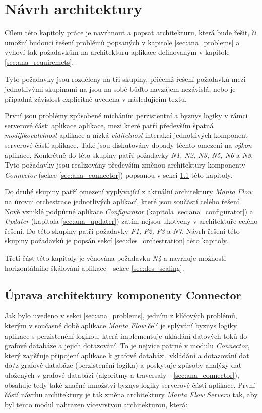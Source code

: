 \chapter{Návrh architektury}
Cílem této kapitoly práce je navrhnout a popsat architekturu, která bude řešit, či umožní budoucí řešení problémů popsaných v kapitole \ref{sec:ana_problems} a vyhoví tak požadavkům na architekturu aplikace definovaným v kapitole \ref{sec:ana_requiremets}.

Tyto požadavky jsou rozděleny na tři skupiny, přičemž řešení požadavků mezi jednotlivými skupinami na jsou na sobě bůďto navzájem nezávislá, nebo je případná závislost explicitně uvedena v následujícím textu.

První jsou problémy způsobené mícháním perzistentní a byznys logiky v rámci serverové části aplikace aplikace, mezi které patří především špatná \textit{modifikovatelnost} aplikace a nízká \textit{viditelnost} interakcí jednotlivých komponent serverové částí aplikace. Také jsou diskutovány dopady těchto omezení na \textit{výkon} aplikace. Konkrétně do této skupiny patří požadavky \textit{N1, N2, N3, N5, N6} a \textit{N8}. Tyto požadavky jsou realizovány především změnou architektury komponenty \textit{Connector} (sekce \ref{sec:ana_connector}) popsanou v sekci \ref{sec:des_api} této kapitoly.

Do druhé skupiny patří omezení vyplývající z aktuální architektury \textit{Manta Flow} na úrovni orchestrace jednotlivých aplikací, které jsou součástí celého řešení. Nově vzniklé podpůrné aplikace \textit{Configurator} (kapitola \ref{sec:ana_configurator}) a \textit{Updater} (kapitola \ref{sec:ana_updater}) zatím nejsou ukotveny v architektuře celého řešení.
Do této skupiny patří požadavky \textit{F1, F2, F3} a \textit{N7}. Návrh řešení této skupiny požadavků je popsán sekcí \ref{sec:des_orchestration} této kapitoly.

Třetí část této kapitoly je věnována požadavku \textit{N4} a navrhuje možnosti horizontálního škálování aplikace - sekce \ref{sec:des_scaling}.

\section{Úprava architektury komponenty Connector}
\label{sec:des_api}
Jak bylo uvedeno v sekci \ref{sec:ana_problems}, jedním z klíčových problémů, kterým v současné době aplikace \textit{Manta Flow} čelí je splývání byznys logiky aplikace s perzistenční logikou, která implementuje ukládání datových toků do grafové databáze a jejich dotazování. To je nejvíce patrné v modulu \textit{Connector}, který zajišťuje připojení aplikace k grafové databázi, vkládání a dotazování dat do/z grafové databáze (perzistenční logika) a poskytuje způsoby analýzy dat uložených v grafové databázi (algoritmy a traversaly - \ref{sec:ana_connector}), obsahuje tedy také značné množství byznys logiky serverové části aplikace. První částí návrhu architektury je tak změna architektury \textit{Manta Flow Serveru} tak, aby byl tento modul nahrazen vícevrstvou architekturou, která:

